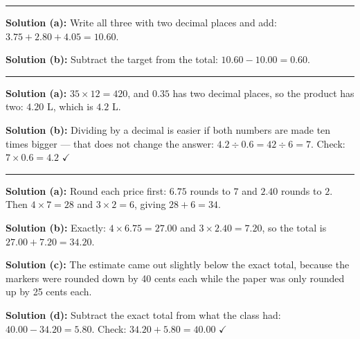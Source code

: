\documentclass[12pt]{article}
\begin{document}
\vspace{0.2cm}\noindent\rule{\linewidth}{0.2pt}


\textbf{Solution (a):} Write all three with two decimal places and add:
$3.75 + 2.80 + 4.05 = 10.60$.

\textbf{Solution (b):} Subtract the target from the total:
$10.60 - 10.00 = 0.60$.

\vspace{0.2cm}\noindent\rule{\linewidth}{0.2pt}


\textbf{Solution (a):} $35 \times 12 = 420$, and $0.35$ has two decimal places, so
the product has two: $4.20$ L, which is $4.2$ L.

\textbf{Solution (b):} Dividing by a decimal is easier if both numbers are made ten
times bigger --- that does not change the answer:
$4.2 \div 0.6 = 42 \div 6 = 7$.
Check: $7 \times 0.6 = 4.2$ $\checkmark$

\vspace{0.2cm}\noindent\rule{\linewidth}{0.2pt}


\textbf{Solution (a):} Round each price first: $6.75$ rounds to $7$ and $2.40$
rounds to $2$. Then $4 \times 7 = 28$ and $3 \times 2 = 6$, giving $28 + 6 = 34$.

\textbf{Solution (b):} Exactly: $4 \times 6.75 = 27.00$ and $3 \times 2.40 = 7.20$,
so the total is $27.00 + 7.20 = 34.20$.

\textbf{Solution (c):} The estimate came out slightly below the exact total, because
the markers were rounded down by 40 cents each while the paper was only rounded up by
25 cents each.

\textbf{Solution (d):} Subtract the exact total from what the class had:
$40.00 - 34.20 = 5.80$.
Check: $34.20 + 5.80 = 40.00$ $\checkmark$
\end{document}
